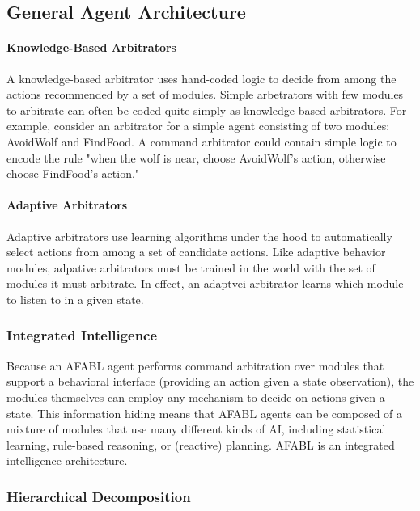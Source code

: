 \subsection{General Agent Architecture}


\paragraph{Knowledge-Based Arbitrators}

A knowledge-based arbitrator uses hand-coded logic to decide from
among the actions recommended by a set of modules.  Simple arbetrators
with few modules to arbitrate can often be coded quite simply as
knowledge-based arbitrators.  For example, consider an arbitrator for
a simple agent consisting of two modules: AvoidWolf and FindFood.  A
command arbitrator could contain simple logic to encode the rule "when
the wolf is near, choose AvoidWolf's action, otherwise choose
FindFood's action."


\paragraph{Adaptive Arbitrators}

Adaptive arbitrators use learning algorithms under the hood to
automatically select actions from among a set of candidate actions.
Like adaptive behavior modules, adpative arbitrators must be trained
in the world with the set of modules it must arbitrate.  In effect, an
adaptvei arbitrator learns which module to listen to in a given state.


\subsubsection{Integrated Intelligence}

Because an AFABL agent performs command arbitration over modules that
support a behavioral interface (providing an action given a state
observation), the modules themselves can employ any mechanism to
decide on actions given a state.  This information hiding means that
AFABL agents can be composed of a mixture of modules that use many
different kinds of AI, including statistical learning, rule-based
reasoning, or (reactive) planning.  AFABL is an integrated
intelligence architecture.



\subsubsection{Hierarchical Decomposition}


